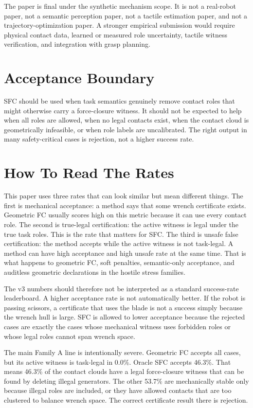 \documentclass{article}
\begin{document}
The paper is final under the synthetic mechanism scope. It is not a real-robot paper, not a semantic perception paper, not a tactile estimation paper, and not a trajectory-optimization paper. A stronger empirical submission would require physical contact data, learned or measured role uncertainty, tactile witness verification, and integration with grasp planning.

\section{Acceptance Boundary}

SFC should be used when task semantics genuinely remove contact roles that might otherwise carry a force-closure witness. It should not be expected to help when all roles are allowed, when no legal contacts exist, when the contact cloud is geometrically infeasible, or when role labels are uncalibrated. The right output in many safety-critical cases is rejection, not a higher success rate.

\section{How To Read The Rates}

This paper uses three rates that can look similar but mean different things. The first is mechanical acceptance: a method says that some wrench certificate exists. Geometric FC usually scores high on this metric because it can use every contact role. The second is true-legal certification: the active witness is legal under the true task roles. This is the rate that matters for SFC. The third is unsafe false certification: the method accepts while the active witness is not task-legal. A method can have high acceptance and high unsafe rate at the same time. That is what happens to geometric FC, soft penalties, semantic-only acceptance, and auditless geometric declarations in the hostile stress families.

The v3 numbers should therefore not be interpreted as a standard success-rate leaderboard. A higher acceptance rate is not automatically better. If the robot is passing scissors, a certificate that uses the blade is not a success simply because the wrench hull is large. SFC is allowed to lower acceptance because the rejected cases are exactly the cases whose mechanical witness uses forbidden roles or whose legal roles cannot span wrench space.

The main Family A line is intentionally severe. Geometric FC accepts all cases, but its active witness is task-legal in 0.0\%. Oracle SFC accepts 46.3\%. That means 46.3\% of the contact clouds have a legal force-closure witness that can be found by deleting illegal generators. The other 53.7\% are mechanically stable only because illegal roles are included, or they have allowed contacts that are too clustered to balance wrench space. The correct certificate result there is rejection.
\end{document}
